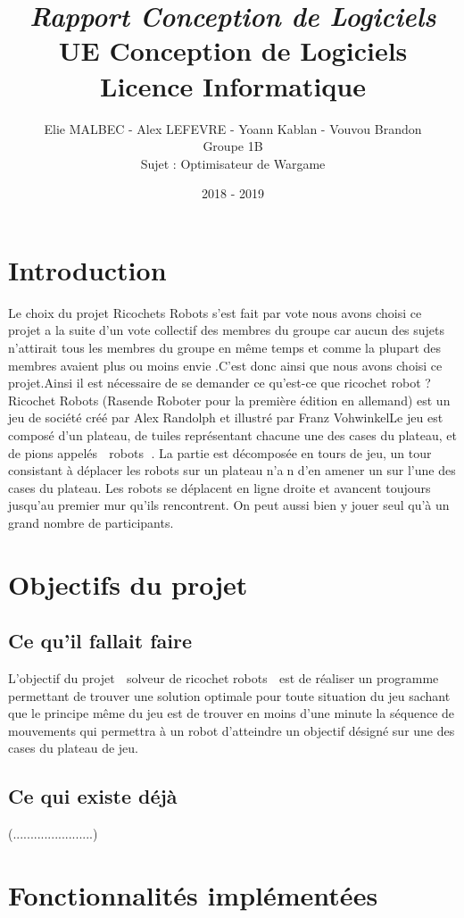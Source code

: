 \documentclass[a4paper]{article} %
\title{
\LARGE{\em{Rapport Conception de Logiciels}}\\\vspace*{0.5cm}
UE Conception de Logiciels\\
Licence Informatique
}
\author{
Elie MALBEC - Alex LEFEVRE -  Yoann Kablan - Vouvou Brandon\\
Groupe 1B\\
Sujet : Optimisateur de Wargame
}
\date{2018 - 2019}
\begin{document}
\newpage
\newpage
	\null %
\newpage

\tableofcontents
\newpage

\section{Introduction}
Le choix du projet Ricochets Robots s'est fait par vote nous avons choisi ce projet a la suite d'un vote collectif des membres du groupe car aucun des sujets n'attirait tous les membres du groupe en même temps et comme la plupart des membres avaient plus ou moins envie .C'est donc ainsi que nous avons choisi ce projet.Ainsi il est nécessaire de se demander ce qu'est-ce que ricochet robot ? Ricochet Robots (Rasende Roboter pour la première édition en allemand) est un jeu de société créé par Alex Randolph et illustré par Franz VohwinkelLe jeu est composé d'un plateau, de tuiles représentant chacune une des cases du plateau, et de pions appelés  robots . La partie est décomposée en tours de jeu, un tour consistant à déplacer les robots sur un plateau n'an d'en amener un sur l'une des cases du plateau. Les robots se déplacent en ligne droite et avancent toujours jusqu'au premier mur qu'ils rencontrent. On peut aussi bien y jouer seul qu'à un grand nombre de participants.

\section{Objectifs du projet}	
	\subsection{Ce qu’il fallait faire}
L'objectif du projet  solveur de ricochet robots  est de réaliser un programme permettant de trouver une solution optimale pour toute situation du jeu sachant que le principe même du jeu est de trouver en moins d'une minute la séquence de mouvements qui permettra à un robot d'atteindre un objectif désigné sur une des cases du plateau de jeu.
	\subsection{Ce qui existe déjà}
(.......................)

\section{Fonctionnalités implémentées}
\end{document}
